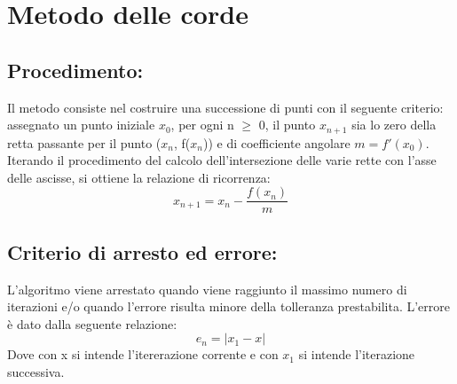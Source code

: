 \documentclass[a4paper,12pt,]{article}
\begin{document}
\section{Metodo delle corde}
\subsection{Procedimento:}
Il metodo consiste nel costruire una successione di punti con il seguente criterio:	
assegnato un punto iniziale $x_0$, per ogni n $\ge$ 0, il punto $x_{n+1}$ sia lo zero della retta passante per il punto ($x_n$, f($x_n$)) e di coefficiente angolare $m = f'(x_0)$.
Iterando il procedimento del calcolo dell'intersezione delle varie rette con l'asse delle ascisse, si ottiene la relazione di ricorrenza:
\begin{equation}	x_{n+1} =  x_n - \frac {f(x_n)}{m} \end{equation}

\subsection{Criterio di arresto ed errore:}
L'algoritmo viene arrestato quando viene raggiunto il massimo numero di iterazioni e/o quando l'errore risulta minore della tolleranza prestabilita.
L'errore è dato dalla seguente relazione:
\begin{equation} e_n=|x_1-x| \end{equation}
Dove con x  si intende l'itererazione corrente e con  $x_1$  si intende l'iterazione successiva.
\end{document}
